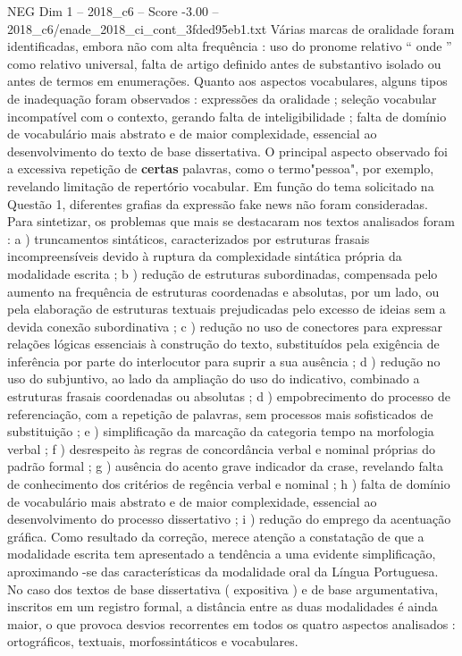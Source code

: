 \begin{textsample}{NEG Dim 1 – 2018\_c6 – Score -3.00 – 2018\_c6/enade\_2018\_ci\_cont\_3fded95eb1.txt}
Várias marcas de oralidade foram identificadas, embora não com alta frequência : uso do pronome relativo “ onde ” como relativo universal, falta de artigo definido antes de substantivo isolado ou antes de termos em enumerações.
Quanto aos aspectos vocabulares, alguns tipos de inadequação foram observados : expressões da oralidade ; seleção vocabular incompatível com o contexto, gerando falta de inteligibilidade ; falta de domínio de vocabulário mais abstrato e de maior complexidade, essencial ao desenvolvimento do texto de base dissertativa.
O principal aspecto observado foi a excessiva repetição de \textbf{certas} palavras, como o termo"pessoa", por exemplo, revelando limitação de repertório vocabular.
Em função do tema solicitado na Questão 1, diferentes grafias da expressão fake news não foram consideradas.
Para sintetizar, os problemas que mais se destacaram nos textos analisados foram : a ) truncamentos sintáticos, caracterizados por estruturas frasais incompreensíveis devido à ruptura da complexidade sintática própria da modalidade escrita ; b ) redução de estruturas subordinadas, compensada pelo aumento na frequência de estruturas coordenadas e absolutas, por um lado, ou pela elaboração de estruturas textuais prejudicadas pelo excesso de ideias sem a devida conexão subordinativa ; c ) redução no uso de conectores para expressar relações lógicas essenciais à construção do texto, substituídos pela exigência de inferência por parte do interlocutor para suprir a sua ausência ; d ) redução no uso do subjuntivo, ao lado da ampliação do uso do indicativo, combinado a estruturas frasais coordenadas ou absolutas ; d ) empobrecimento do processo de referenciação, com a repetição de palavras, sem processos mais sofisticados de substituição ; e ) simplificação da marcação da categoria tempo na morfologia verbal ; f ) desrespeito às regras de concordância verbal e nominal próprias do padrão formal ; g ) ausência do acento grave indicador da crase, revelando falta de conhecimento dos critérios de regência verbal e nominal ; h ) falta de domínio de vocabulário mais abstrato e de maior complexidade, essencial ao desenvolvimento do processo dissertativo ; i ) redução do emprego da acentuação gráfica.
Como resultado da correção, merece atenção a constatação de que a modalidade escrita tem apresentado a tendência a uma evidente simplificação, aproximando -se das características da modalidade oral da Língua Portuguesa.
No caso dos textos de base dissertativa ( expositiva ) e de base argumentativa, inscritos em um registro formal, a distância entre as duas modalidades é ainda maior, o que provoca desvios recorrentes em todos os quatro aspectos analisados : ortográficos, textuais, morfossintáticos e vocabulares.

\end{textsample}
